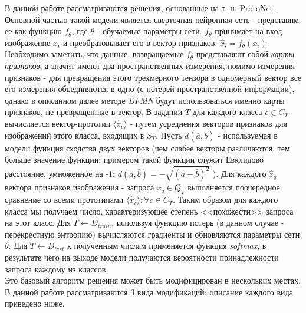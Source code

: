 \documentclass[a4paper, 12pt]{report}
\begin{document}
В данной работе рассматриваются решения, основанные на т. н. ProtoNet \cite{closerlook}. Основной частью такой модели является сверточная нейронная сеть - представим ее как функцию $f_{\theta}$, где $\theta$ - обучаемые параметры сети. $f_{\theta}$ принимает на вход изображение $x_i$ и преобразовывает его в вектор признаков: $\hat{x}_i = f_{\theta}(x_i)$. Необходимо заметить, что данные, возвращаемые $f_{\theta}$ представляют собой \textit{карты признаков}, а значит имеют два пространственных измерения, помимо измерения признаков - для превращения этого трехмерного тензора в одномерный вектор все его измерения объединяются в одно (с потерей пространственной информации), однако в описанном далее методе \textit{DFMN} будут использоваться именно карты признаков, не превращенные в вектор.  В задании $T$ для каждого класса $c \in C_T$ вычисляется вектор-прототип $\langle  \hat{x}_c \rangle$ - путем усреднения векторов признаков для изображений этого класса, входящих в $S_T$. Пусть $d(\bar{a}, \bar{b})$ - используемая в модели функция сходства двух векторов (чем слабее векторы различаются, тем больше значение функции; примером такой функции служит Евклидово расстояние, умноженное на -1: $d(\bar{a}, \bar{b}) = -\sqrt{{(\bar{a} - \bar{b})}^2}$ ). Для каждого $ \hat{x}_q  $ вектора признаков изображения - запроса $x_q \in Q_T$ выполняется поочередное сравнение со всеми прототипами $\langle \hat{x}_c \rangle : \forall c \in C_T$. Таким образом для каждого класса мы получаем число, характеризующее степень <<похожести>> запроса на этот класс. Для $T \leftarrow D_{train}$, используя функцию потерь (в данном случае - перекрестную энтропию) вычисляются градиенты и обновляются параметры сети $\theta$. Для $T \leftarrow D_{test}$ к полученным числам применяется функция \textit{softmax}, в результате чего на выходе модели получаются вероятности принадлежности запроса каждому из классов. \\

Это базовый алгоритм решения может быть модифицирован в нескольких местах. В данной работе рассматриваются 3 вида модификаций: описание каждого вида приведено ниже.
\end{document}
